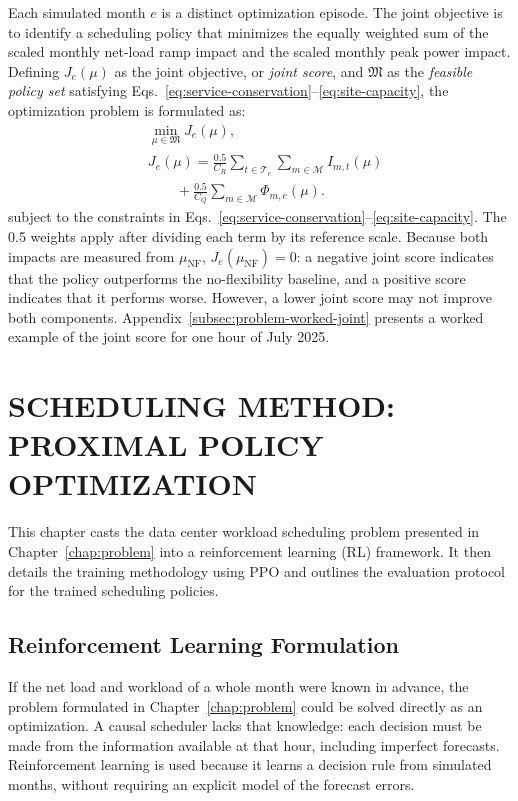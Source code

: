 \documentclass{UNCC-thesis}
\begin{document}
Each simulated month \(e\) is a distinct optimization episode. The joint objective is
to identify a scheduling policy that minimizes the equally weighted sum of the scaled
monthly net-load ramp impact and the scaled monthly peak power impact. Defining
\(J_e(\mu)\) as the joint objective, or \emph{joint score}, and \(\mathfrak M\) as the
\emph{feasible policy set} satisfying
Eqs.~\eqref{eq:service-conservation}--\eqref{eq:site-capacity}, the optimization
problem is formulated as:
\begin{equation}
  \begin{aligned}
    &\min_{\mu\in\mathfrak M} J_e(\mu),\\
    &J_e(\mu)
    =
    \frac{0.5}{C_R}
    \sum_{t\in\mathcal T_e}\sum_{m\in\mathcal M} I_{m,t}(\mu)\\
    &\hspace{2em}
    +\frac{0.5}{C_Q}
    \sum_{m\in\mathcal M} \Phi_{m,e}(\mu).
  \end{aligned}
  \label{eq:objective}
\end{equation}
subject to the constraints in
Eqs.~\eqref{eq:service-conservation}--\eqref{eq:site-capacity}.
The 0.5 weights apply after dividing each term by its reference scale.
Because both impacts are measured
from \(\mu_{\mathrm{NF}}\), \(J_e(\mu_{\mathrm{NF}})=0\): a negative joint score indicates
that the policy outperforms the no-flexibility baseline, and a positive score indicates
that it performs worse. However, a lower joint score may not improve both components.
Appendix~\ref{subsec:problem-worked-joint} presents a worked example
of the joint score for one hour of July 2025.

\chapter{SCHEDULING METHOD: PROXIMAL POLICY OPTIMIZATION}
\label{chap:method}

This chapter casts the data center workload scheduling problem presented in
Chapter~\ref{chap:problem} into a reinforcement learning (RL) framework. It then details the
training methodology using PPO and outlines the evaluation protocol for the trained
scheduling policies.

\section{Reinforcement Learning Formulation}
\label{sec:method-formulation}

If the net load and workload of a whole month were known in advance, the problem formulated in
Chapter~\ref{chap:problem} could be solved directly as an optimization. A causal
scheduler lacks that knowledge: each decision must be made from the information available at
that hour, including imperfect forecasts. Reinforcement learning is used because it
learns a decision rule from simulated months, without requiring an explicit model of the
forecast errors.
\end{document}
